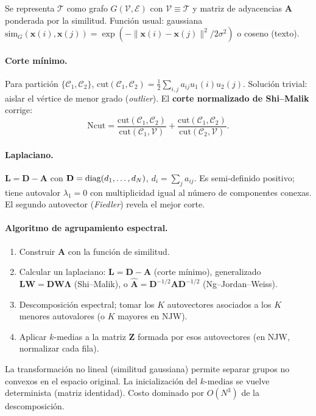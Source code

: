 Se representa $\mathcal{T}$ como grafo $G(\mathcal{V},\mathcal{E})$ con
$\mathcal{V}\equiv\mathcal{T}$ y matriz de adyacencias $\mathbf{A}$
ponderada por la similitud. Función usual: gaussiana
$\mathrm{sim}_G(\mathbf{x}(i),\mathbf{x}(j))=\exp(-\|\mathbf{x}(i)-\mathbf{x}(j)\|^2/2\sigma^2)$
o coseno (texto).

\paragraph{Corte mínimo.} Para partición
$\{\mathcal{C}_1,\mathcal{C}_2\}$,
$\mathrm{cut}(\mathcal{C}_1,\mathcal{C}_2)=\frac12\sum_{i,j}a_{ij}u_1(i)u_2(j)$.
Solución trivial: aislar el vértice de menor grado (\emph{outlier}).
El \textbf{corte normalizado de Shi--Malik} corrige:
\[
\mathrm{Ncut}=\frac{\mathrm{cut}(\mathcal{C}_1,\mathcal{C}_2)}{\mathrm{cut}(\mathcal{C}_1,\mathcal{V})}
+\frac{\mathrm{cut}(\mathcal{C}_1,\mathcal{C}_2)}{\mathrm{cut}(\mathcal{C}_2,\mathcal{V})}.
\]

\paragraph{Laplaciano.} $\mathbf{L}=\mathbf{D}-\mathbf{A}$ con
$\mathbf{D}=\operatorname{diag}(d_1,\dots,d_N)$, $d_i=\sum_j a_{ij}$. Es semi-definido
positivo; tiene autovalor $\lambda_1=0$ con multiplicidad igual al
número de componentes conexas. El segundo autovector (\emph{Fiedler})
revela el mejor corte.

\paragraph{Algoritmo de agrupamiento espectral.}
\begin{enumerate}[leftmargin=1.2cm]
  \item Construir $\mathbf{A}$ con la función de similitud.
  \item Calcular un laplaciano: $\mathbf{L}=\mathbf{D}-\mathbf{A}$
        (corte mínimo), generalizado
        $\mathbf{L}\mathbf{W}=\mathbf{D}\mathbf{W}\boldsymbol\Lambda$
        (Shi--Malik), o
        $\hat{\mathbf{A}}=\mathbf{D}^{-1/2}\mathbf{A}\mathbf{D}^{-1/2}$
        (Ng--Jordan--Weiss).
  \item Descomposición espectral; tomar los $K$ autovectores asociados
        a los $K$ menores autovalores (o $K$ mayores en NJW).
  \item Aplicar $k$-medias a la matriz $\mathbf{Z}$ formada por esos
        autovectores (en NJW, normalizar cada fila).
\end{enumerate}
La transformación no lineal (similitud gaussiana) permite separar
grupos no convexos en el espacio original. La inicialización del
$k$-medias se vuelve determinista (matriz identidad). Costo dominado
por $O(N^3)$ de la descomposición.


